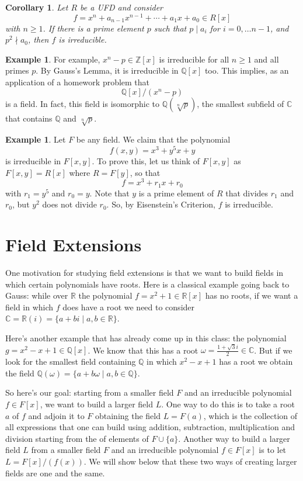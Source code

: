 \documentclass[12pt]{report}
\newtheorem{corollary}[theorem]{Corollary}
\numberwithin{equation}{section}
\numberwithin{theorem}{chapter}
\theoremstyle{definition}
\newtheorem{example}[theorem]{Example}
\newtheorem*{basic properties}{Basic Properties}
\newtheorem*{Important Remark}{Important Remark}
\newcommand{\R}{\mathbb{R}}
\newcommand{\Z}{\mathbb{Z}}
\newcommand{\Q}{\mathbb{Q}}
\newcommand{\C}{\mathbb{C}}
\begin{document}
\begin{corollary} 
Let $R$ be a UFD and consider 
$$f = x^n + a_{n-1} x^{n-1} + \cdots + a_1 x + a_0 \in R[x]$$ 
with $n \geqslant 1$. If there is a prime element $p$ such that $p \mid a_i$ for $i = 0, \dots n-1$, and $p^2 \nmid a_0$, then $f$ is irreducible.
\end{corollary}



\begin{example}
For example, $x^n - p \in \Z[x]$ is irreducible for all $n \geq 1$ and all primes $p$.
By Gauss's Lemma, it is irreducible in $\Q[x]$ too. This implies, as an application of a homework problem   that
$$
\Q[x]/(x^n-p)
$$
is a field. In fact, this field is isomorphic to $\Q(\sqrt[n]{p})$, the smallest subfield of $\C$ that contains $\Q$ and  $\sqrt[n]{p}$.
\end{example}


\begin{example} 
Let $F$ be any field.
We claim that the polynomial 
$$f(x,y) = x^3 + y^5 x + y$$ 
is irreducible in $F[x,y]$. To prove this, let us think of $F[x,y]$ as $F[x,y] = R[x]$ where $R = F[y]$, so that 
$$f = x^3 + r_1 x + r_0$$ 
with $r_1 = y^5$ and $r_0 = y$. Note that $y$ is a prime element of $R$ that divides $r_1$ and $r_0$, but $y^2$ does not divide $r_0$. So, by Eisenstein's Criterion, $f$ is irreducible.
\end{example}






\chapter{Field Extensions}

One motivation for studying field extensions is that we want to build fields in which certain polynomials have roots. 
Here is a classical example going back to Gauss: while over $\R$ the polynomial $f = x^2+1\in \R[x]$ has no roots, if we want a field in which $f$ does have a root we need to consider $\C=\R(i)=\{a+bi\mid a,b\in \R\}$. 

Here's another example that has already come up in this class: the polynomial $g=x^2-x+1 \in \Q[x]$. We know that this has a root $\omega = \frac{1 + \sqrt{3}i}{2}\in \C$. But if we look for the smallest field containing $\Q$ in which $x^2-x+1$ has a root we obtain the field $\Q(\omega)=\{a+b\omega \mid a,b\in \Q\}$.

So here's our goal: starting from a smaller field $F$ and an irreducible polynomial $f\in F[x]$, we want to build a larger field $L$. One way to do this is to take a root $a$ of $f$ and adjoin it to $F$ obtaining the field $L=F(a)$, which is the collection of all expressions that one can build using addition, subtraction, multiplication and division starting from the of elements of $F\cup\{a\}$.
Another way to build a larger field $L$ from a smaller field $F$ and an irreducible polynomial $f\in F[x]$ is to
let $L=F[x]/(f(x))$. We will show below that these two ways of creating larger fields are one and the same.
\end{document}
